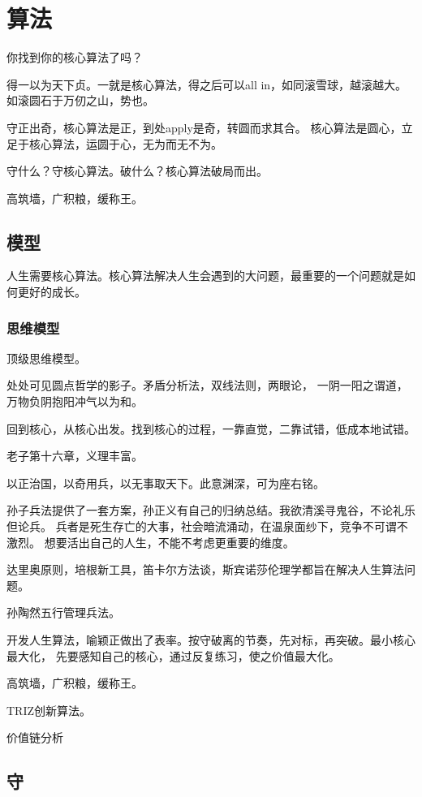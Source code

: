 \chapter{算法}

你找到你的核心算法了吗？

得一以为天下贞。一就是核心算法，得之后可以all in，如同滚雪球，越滚越大。
如滚圆石于万仞之山，势也。

守正出奇，核心算法是正，到处apply是奇，转圆而求其合。
核心算法是圆心，立足于核心算法，运圆于心，无为而无不为。

守什么？守核心算法。破什么？核心算法破局而出。

高筑墙，广积粮，缓称王。

\section{模型}

人生需要核心算法。核心算法解决人生会遇到的大问题，最重要的一个问题就是如何更好的成长。

\subsection{思维模型}

顶级思维模型。

处处可见圆点哲学的影子。矛盾分析法，双线法则，两眼论，
一阴一阳之谓道，万物负阴抱阳冲气以为和。

回到核心，从核心出发。找到核心的过程，一靠直觉，二靠试错，低成本地试错。

老子第十六章，义理丰富。

以正治国，以奇用兵，以无事取天下。此意渊深，可为座右铭。

孙子兵法提供了一套方案，孙正义有自己的归纳总结。我欲清溪寻鬼谷，不论礼乐但论兵。
兵者是死生存亡的大事，社会暗流涌动，在温泉面纱下，竞争不可谓不激烈。
想要活出自己的人生，不能不考虑更重要的维度。

达里奥原则，培根新工具，笛卡尔方法谈，斯宾诺莎伦理学都旨在解决人生算法问题。

孙陶然五行管理兵法。

开发人生算法，喻颖正做出了表率。按守破离的节奏，先对标，再突破。最小核心最大化，
先要感知自己的核心，通过反复练习，使之价值最大化。

高筑墙，广积粮，缓称王。

TRIZ创新算法。

价值链分析

\section{守}

